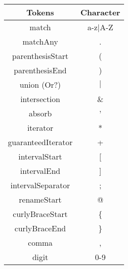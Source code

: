 \begin{tabular}{|c|c|}
    \hline
    \textbf{Tokens} & \textbf{Character}\\
    \hline
    match & a-z$\mid$A-Z\\
    \hline
    matchAny & .\\
    \hline
    parenthesisStart & (\\
    \hline
    parenthesisEnd & )\\
    \hline
    union (Or?) & $\mid$\\
    \hline
    intersection & \&\\
    \hline
    absorb & '\\
    \hline
    iterator & *\\
    \hline
    guaranteedIterator & +\\
    \hline
    intervalStart & [\\
    \hline
    intervalEnd & ]\\
    \hline
    intervalSeparator & ;\\
    \hline
    renameStart & @\\
    \hline
    curlyBraceStart & \{\\
    \hline
    curlyBraceEnd & \}\\
    \hline
    comma & ,\\
    \hline
    digit & 0-9\\
    \hline
\end{tabular}